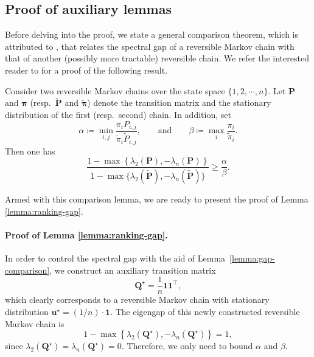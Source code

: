 \subsection{Proof of auxiliary lemmas \label{subsec:Proof-of-auxilliary-ranking}}

Before delving into the proof, we state a general comparison theorem, which is attributed to \citet{diaconis1993comparison},
that relates the spectral gap of a reversible Markov chain with that
of another (possibly more tractable) reversible chain. We refer the interested reader
to \citet[Lemma 6]{negahban2016rank} for a proof of the following result.
%
\begin{lemma}
	\label{lemma:gap-comparison}
	Consider two reversible Markov chains over the state space $\{1,2,\cdots,n\}$.
	Let $\bm{P}$ and $\bm{\pi}$ (resp.~$\widetilde{\bm{P}}$ and $\widetilde{\bm{\pi}}$) denote
	the transition matrix and the stationary distribution of the first (resp.~second) chain.
	In addition, set
\[
	\alpha\coloneqq\min_{i,j}
	\frac{\pi_i P_{i,j}}{\widetilde{\pi}_i \widetilde{P}_{i,j}},
	\qquad\text{and}\qquad
	\beta\coloneqq\max_i\frac{\pi_i}{\widetilde{\pi}_i}.
\]
%
Then one has
%
\[
	\frac{1-\max\left\{ \lambda_{2}(\bm{P}),-\lambda_{n}(\bm{P})\right\} }{1-\max\big\{ \lambda_{2}(\widetilde{\bm{P}}),-\lambda_{n}(\widetilde{\bm{P}})\big\} }
	\geq\frac{\alpha}{\beta}.
\]
%
\end{lemma}
%
Armed with this comparison lemma, we are ready to present the proof of Lemma \ref{lemma:ranking-gap}.




\paragraph{Proof of Lemma \ref{lemma:ranking-gap}.}
In order to control the spectral gap with the aid of Lemma~\ref{lemma:gap-comparison}, we construct an auxiliary transition matrix
%
\[
\bm{Q}^{\star}=\frac{1}{n}\bm{1}\bm{1}^{\top},
\]
%
which clearly corresponds to a reversible Markov chain with  stationary distribution $\bm{u}^{\star}=(1/n)\cdot\bm{1}$.  The eigengap of this newly constructed reversible Markov chain is
$$1-\max\left\{ \lambda_{2}(\bm{Q}^{\star}),-\lambda_{n}(\bm{Q}^{\star})\right\} =1,$$
since $\lambda_{2}(\bm{Q}^{\star})=\lambda_{n}(\bm{Q}^{\star})=0$.  Therefore, we only need to bound $\alpha$ and $\beta$.


